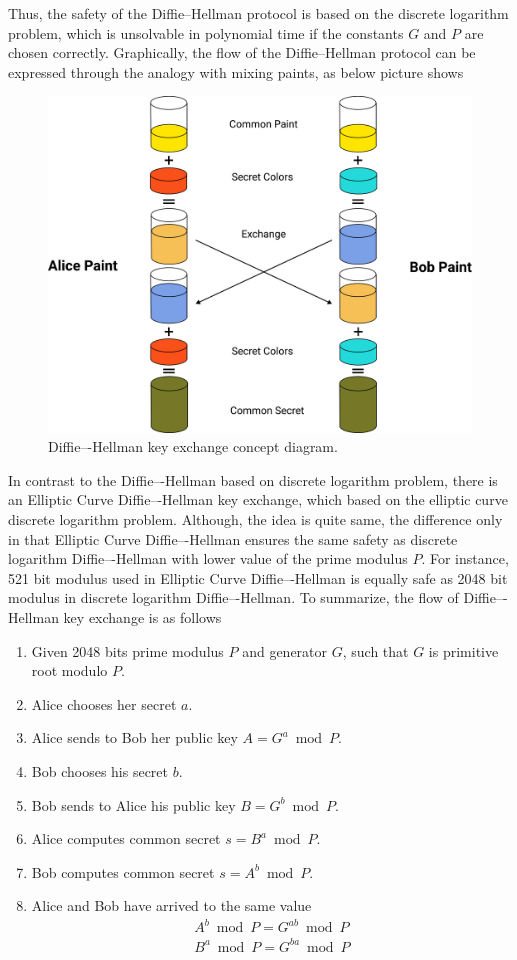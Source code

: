 Thus, the safety of the Diffie--Hellman protocol is based on the discrete logarithm problem, which is unsolvable
in polynomial time if the constants $G$ and $P$ are chosen correctly.
Graphically, the flow of the Diffie--Hellman protocol can be expressed through the
analogy with mixing paints, as below picture shows
\begin{figure}[H]
    \centering
    \includegraphics[width=1\textwidth]{Pictures/07_Diffie-Hellman_keyexchange_concept_diagram}
    \caption{Diffie–-Hellman key exchange concept diagram.}\label{fig:figure4}
\end{figure}
In contrast to the Diffie–-Hellman based on discrete logarithm problem, there is an Elliptic Curve Diffie–-Hellman
key exchange, which based on the elliptic curve discrete logarithm problem.
Although, the idea is quite same, the difference only in that Elliptic Curve Diffie–-Hellman ensures the same safety
as discrete logarithm Diffie–-Hellman with lower value of the prime modulus $P$.
For instance, 521 bit modulus used in Elliptic Curve Diffie–-Hellman is equally safe as 2048 bit modulus in
discrete logarithm Diffie–-Hellman.
To summarize, the flow of Diffie–-Hellman key exchange is as follows
\begin{enumerate}
    \item Given 2048 bits prime modulus $P$ and generator $G$, such that $G$ is primitive root modulo $P$.
    \item Alice chooses her secret $a$.
    \item Alice sends to Bob her public key $A = G^a \bmod P$.
    \item Bob chooses his secret $b$.
    \item Bob sends to Alice his public key $B = G^b \bmod P$.
    \item Alice computes common secret $s = B^a \bmod P$.
    \item Bob computes common secret $s = A^b \bmod P$.
    \item Alice and Bob have arrived to the same value
    \begin{eqnarray}
        A^b \bmod P = G^{ab} \bmod P \\
        B^a \bmod P = G^{ba} \bmod P
    \end{eqnarray}
\end{enumerate}

